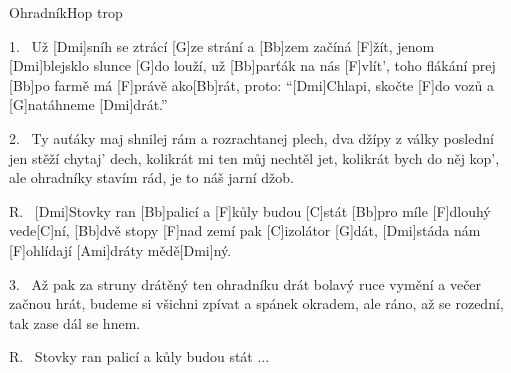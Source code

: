 \begin{song}{Ohradník}{Hop trop}

\begin{xverse}{1.~}
Už [Dmi]sníh se ztrácí [G]ze strání a [Bb]zem začíná [F]{žít,}
jenom [Dmi]blejsklo slunce [G]do louží, už [Bb]parťák na nás [F]vlít',
toho flákání prej [Bb]po farmě má [F]právě ako[Bb]rát,
proto: ``[Dmi]Chlapi, skočte [F]do vozů a [G]natáhneme [Dmi]drát.''
\end{xverse}


\begin{xverse}{2.~}
Ty auťáky maj shnilej rám a rozrachtanej plech,
dva džípy z války poslední jen stěží chytaj' dech,
kolikrát mi ten můj nechtěl jet, kolikrát bych do něj kop',
ale ohradníky stavím rád, je to náš jarní džob.
\end{xverse}


\begin{xverse}{R.~}
[Dmi]Stovky ran [Bb]palicí a [F]kůly budou [C]stát
[Bb]pro míle [F]dlouhý vede[C]ní,
[Bb]dvě stopy [F]nad zemí pak [C]izolátor [G]dát,
[Dmi]stáda nám [F]ohlídají [Ami]dráty mědě[Dmi]ný.
\end{xverse}


\begin{xverse}{3.~}
Až pak za struny drátěný ten ohradníku drát
bolavý ruce vymění a večer začnou hrát,
budeme si všichni zpívat a spánek okradem,
ale ráno, až se rozední, tak zase dál se hnem.
\end{xverse}

\begin{xverse}{R.~}
Stovky ran palicí a kůly budou stát ...
\end{xverse}

\end{song}

